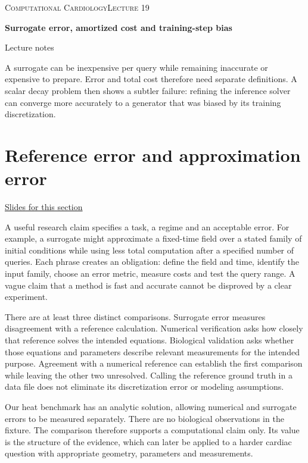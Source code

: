 \documentclass[11pt,letterpaper]{article}
\theoremstyle{definition}\newtheorem{definition}{Definition}\newtheorem{example}{Example}
\numberwithin{equation}{section}
\begin{document}
{\small\scshape Computational Cardiology\hfill Lecture 19}\par\medskip
{\raggedright{}\LARGE\bfseries\color{ink} Surrogate error, amortized cost and training-step bias\par}\medskip
{\small Lecture notes}\par\bigskip
A surrogate can be inexpensive per query while remaining inaccurate or expensive to prepare. Error and total cost therefore need separate definitions. A scalar decay problem then shows a subtler failure: refining the inference solver can converge more accurately to a generator that was biased by its training discretization.

\section{Reference error and approximation error}
\hypertarget{note-reference-error-and-approximation-error}{}\label{note:reference-error-and-approximation-error}
{\small \href{slides.html\#frame=three-solutions-in-an-error-budget\&step=1}{Slides for this section}}\par
A useful research claim specifies a task, a regime and an acceptable error. For example, a surrogate might approximate a fixed-time field over a stated family of initial conditions while using less total computation after a specified number of queries. Each phrase creates an obligation: define the field and time, identify the input family, choose an error metric, measure costs and test the query range. A vague claim that a method is fast and accurate cannot be disproved by a clear experiment.

There are at least three distinct comparisons. Surrogate error measures disagreement with a reference calculation. Numerical verification asks how closely that reference solves the intended equations. Biological validation asks whether those equations and parameters describe relevant measurements for the intended purpose. Agreement with a numerical reference can establish the first comparison while leaving the other two unresolved. Calling the reference ground truth in a data file does not eliminate its discretization error or modeling assumptions.

Our heat benchmark has an analytic solution, allowing numerical and surrogate errors to be measured separately. There are no biological observations in the fixture. The comparison therefore supports a computational claim only. Its value is the structure of the evidence, which can later be applied to a harder cardiac question with appropriate geometry, parameters and measurements.
\end{document}
